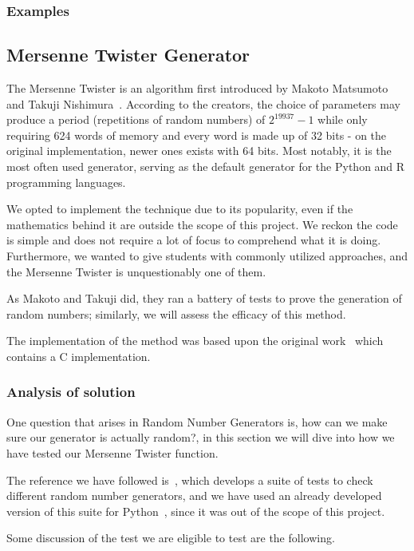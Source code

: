 \subsubsection{Examples}
	


\subsection{Mersenne Twister Generator}
The Mersenne Twister is an algorithm first introduced by Makoto Matsumoto and Takuji Nishimura~\cite{matsumoto1998mersenne}. According to the creators, the choice of parameters may produce a period (repetitions of random numbers) of $2^{19937}-1$ while only requiring 624 words of memory and every word is made up of 32 bits - on the original implementation, newer ones exists with 64 bits. Most notably, it is the most often used generator, serving as the default generator for the Python and R programming languages.

We opted to implement the technique due to its popularity, even if the mathematics behind it are outside the scope of this project. We reckon the code is simple and does not require a lot of focus to comprehend what it is doing. Furthermore, we wanted to give students with commonly utilized approaches, and the Mersenne Twister is unquestionably one of them.

As Makoto and Takuji did, they ran a battery of tests to prove the generation of random numbers; similarly, we will assess the efficacy of this method.

The implementation of the method was based upon the original work~\cite{matsumoto1998mersenne} which contains a C implementation.
\subsubsection{Analysis of solution}
One question that arises in Random Number Generators is, how can we make sure our generator is actually random?, in this section we will dive into how we have tested our Mersenne Twister function.

The reference we have followed is~\cite{smid2010statistical}, which develops a suite of tests to check different random number generators, and we have used an already developed version of this suite for Python~\cite{InsaneMonster2022}, since it was out of the scope of this project. 

Some discussion of the test we are eligible to test are the following.


